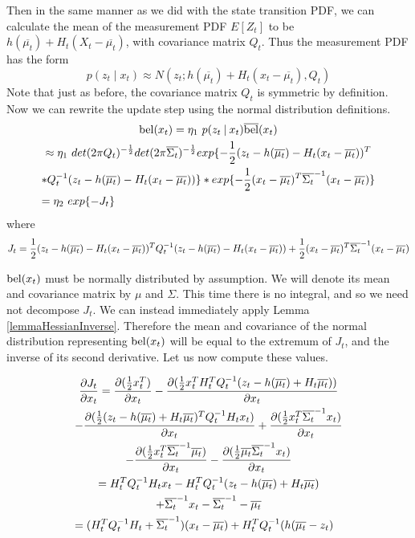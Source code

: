Then in the same manner as we did with the state transition PDF, we can calculate the mean of the measurement PDF \(E[Z_t]\) to be \(h(\overline{\mu_t}) + H_t (X_t - \overline{\mu_t})\), with covariance matrix \(Q_t\). Thus the measurement PDF has the form \[p(z_t \mathbin{\vert} x_t)  \approx N(z_t;h(\overline{\mu_t}) + H_t (x_t - \overline{\mu_t}),Q_t)\] Note that just as before, the covariance matrix \(Q_t\) is symmetric by definition. Now we can rewrite the update step using the normal distribution definitions.
\begin{multline*}
\bel(x_t) = \eta_1\ p(z_t \mathbin{\vert} x_t) \overline{\bel}(x_t) \\
\approx \eta_1\ det(2 \pi Q_t)^{-\frac{1}{2}} det(2 \pi \overline{\Sigma_t})^{-\frac{1}{2}} exp\{-\frac{1}{2} (z_t - h(\overline{\mu_t}) - H_t (x_t - \overline{\mu_t}))^T \\ * Q_t^{-1} (z_t - h(\overline{\mu_t}) - H_t (x_t - \overline{\mu_t}))\} * exp \{-\frac{1}{2} (x_t - \overline{\mu_t})^T \overline{\Sigma_t}^{-1} (x_t - \overline{\mu_t}) \} \\
= \eta_2\ exp\{-J_t\} \hfill
\end{multline*} where \[
J_t = \frac{1}{2} (z_t - h(\overline{\mu_t}) - H_t (x_t - \overline{\mu_t}))^T Q_t^{-1} (z_t - h(\overline{\mu_t}) - H_t (x_t - \overline{\mu_t})) \\
+ \frac{1}{2} (x_t - \overline{\mu_t})^T \overline{\Sigma_t}^{-1} (x_t - \overline{\mu_t})
\]

\(\mathrm{bel}(x_t)\) must be normally distributed by assumption. We will denote its mean and covariance matrix by \(\mu\) and \(\Sigma\). This time there is no integral, and so we need not decompose \(J_t\). We can instead immediately apply Lemma \ref{lemmaHessianInverse}. 
Therefore the mean and covariance of the normal distribution representing \(\mathrm{bel}(x_t)\) will be equal to the extremum of \(J_t\), and the inverse of its second derivative. Let us now compute these values.

\begin{multline*}
\frac{\partial J_t}{\partial x_t} = \frac{\partial (\frac{1}{2} x_t^T )}{\partial x_t} - \frac{\partial (\frac{1}{2} x_t^T H_t^T Q_t^{-1} (z_t - h(\overline{\mu_t}) + H_t \overline{\mu_t}))}{\partial x_t} \\
- \frac{\partial (\frac{1}{2} (z_t - h(\overline{\mu_t}) + H_t \overline{\mu_t})^T Q_t^{-1} H_t x_t)}{\partial x_t} + \frac{\partial (\frac{1}{2} x_t^T \overline{\Sigma_t}^{-1} x_t)}{\partial x_t} \\
- \frac{\partial (\frac{1}{2} x_t^T \overline{\Sigma_t}^{-1} \overline{\mu_t})}{\partial x_t} - \frac{\partial (\frac{1}{2} \overline{\mu_t} \overline{\Sigma_t}^{-1} x_t )}{\partial x_t} \\
= H_t^T Q_t^{-1} H_t x_t - H_t^T Q_t^{-1} (z_t - h(\overline{\mu_t}) + H_t \overline{\mu_t}) \\
+ \overline{\Sigma_t}^{-1} x_t - \overline{\Sigma_t}^{-1} - \overline{\mu_t} \\
= (H_t^T Q_t^{-1} H_t + \overline{\Sigma_t}^{-1}) (x_t - \overline{\mu_t}) + H_t^TQ_t^{-1}(h(\overline{\mu_t} - z_t) \hfill
\end{multline*}

